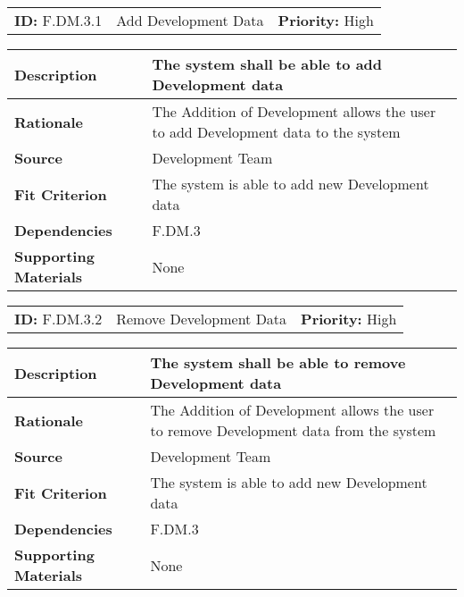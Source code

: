 \begin{table}[H]
    \begin{tabularx}{\textwidth}{| l | X | l |}
        \hline
        \textbf{ID:} F.DM.3.1 & Add Development Data & \textbf{Priority:} High \\
    \end{tabularx}
    \begin{tabularx}{\textwidth}{| l | X |}
        \hline
        \textbf{Description} & The system shall be able to add Development data \\ \hline
        \textbf{Rationale} & The Addition of Development allows the user to add Development data to the system\\ \hline
        \textbf{Source} & Development Team\\ \hline
        \textbf{Fit Criterion} & The system is able to add new Development data\\ \hline
        \textbf{Dependencies} & F.DM.3 \\ \hline
        \textbf{Supporting Materials} & None \\ \hline
    \end{tabularx}
\end{table}

\begin{table}[H]
    \begin{tabularx}{\textwidth}{| l | X | l |}
        \hline
        \textbf{ID:} F.DM.3.2 & Remove Development Data & \textbf{Priority:} High \\
    \end{tabularx}
    \begin{tabularx}{\textwidth}{| l | X |}
        \hline
        \textbf{Description} & The system shall be able to remove Development data \\ \hline
        \textbf{Rationale} & The Addition of Development allows the user to remove Development data from the system\\ \hline
        \textbf{Source} & Development Team\\ \hline
        \textbf{Fit Criterion} & The system is able to add new Development data\\ \hline
        \textbf{Dependencies} & F.DM.3 \\ \hline
        \textbf{Supporting Materials} & None \\ \hline
    \end{tabularx}
\end{table}

